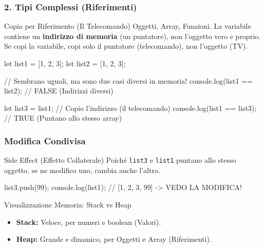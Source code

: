 \subsubsection{2. Tipi Complessi (Riferimenti)}
\begin{concept}{Copia per Riferimento (Il Telecomando)}
Oggetti, Array, Funzioni.
La variabile contiene un \textbf{indirizzo di memoria} (un puntatore), non l'oggetto vero e proprio.
Se copi la variabile, copi solo il puntatore (telecomando), non l'oggetto (TV).
\end{concept}
\begin{jsbox}
let list1 = [1, 2, 3];
let list2 = [1, 2, 3];

// Sembrano uguali, ma sono due casi diversi in memoria!
console.log(list1 == list2); // FALSE (Indirizzi diversi)

let list3 = list1; // Copio l'indirizzo (il telecomando)
console.log(list1 == list3); // TRUE (Puntano allo stesso array)
\end{jsbox}

\subsubsection{Modifica Condivisa}
\begin{concept}{Side Effect (Effetto Collaterale)}
Poiché \texttt{list3} e \texttt{list1} puntano allo stesso oggetto, se ne modifico uno, cambia anche l'altro.
\end{concept}
\begin{jsbox}
list3.push(99);
console.log(list1); // [1, 2, 3, 99] -> VEDO LA MODIFICA!
\end{jsbox}

\begin{concept}{Visualizzazione Memoria: Stack vs Heap}
\begin{itemize}
    \item \textbf{Stack:} Veloce, per numeri e boolean (Valori).
    \item \textbf{Heap:} Grande e dinamico, per Oggetti e Array (Riferimenti).
\end{itemize}
\end{concept}

